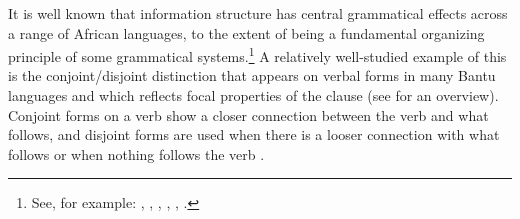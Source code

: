 \documentclass[output=paper]{langscibook}
\begin{document}











It is well known that information structure has central grammatical effects across a range of African languages, to the extent of being a fundamental organizing principle of some grammatical systems.\footnote{See, for example: \citet{HymanWatters:1984:AuxFocus},  \citet{Schwarz:2007:KikuyuFocus}, \citet{AbelsMuriungi:2008:TharakaFocus}, \citet{Hyman:2010:AghemFocus}, \citet{HymanPolinsky:2010:AghemFocus}, \citet{LandmanRanero:2018:KuriaFocus}.} A relatively well-studied example of this is the conjoint/disjoint distinction that appears on verbal forms in many Bantu languages and which reflects focal properties of the clause (see \citealt{VanDerWalHyman:2017:ConjointDisjoint} for an overview). Conjoint forms on a verb show a closer connection between the verb and what follows, and disjoint forms are used when there is a looser connection with what follows or when nothing follows the verb \citep{VanDerWalHyman:2017:ConjointDisjoint}.\largerpage[2] 
\end{document}
